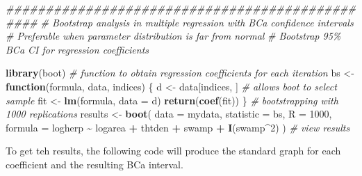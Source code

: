 \documentclass[
  12pt,
]{book}
\newenvironment{Shaded}{\begin{snugshade}}{\end{snugshade}}
\newcommand{\CommentTok}[1]{\textcolor[rgb]{0.56,0.35,0.01}{\textit{#1}}}
\newcommand{\ControlFlowTok}[1]{\textcolor[rgb]{0.13,0.29,0.53}{\textbf{#1}}}
\newcommand{\DataTypeTok}[1]{\textcolor[rgb]{0.13,0.29,0.53}{#1}}
\newcommand{\DecValTok}[1]{\textcolor[rgb]{0.00,0.00,0.81}{#1}}
\newcommand{\KeywordTok}[1]{\textcolor[rgb]{0.13,0.29,0.53}{\textbf{#1}}}
\newcommand{\NormalTok}[1]{#1}
\newcommand{\OperatorTok}[1]{\textcolor[rgb]{0.81,0.36,0.00}{\textbf{#1}}}
\newcommand{\StringTok}[1]{\textcolor[rgb]{0.31,0.60,0.02}{#1}}
\begin{document}
\begin{Shaded}
\begin{Highlighting}[]
\CommentTok{\#\#\#\#\#\#\#\#\#\#\#\#\#\#\#\#\#\#\#\#\#\#\#\#\#\#\#\#\#\#\#\#\#\#\#\#\#\#\#\#\#\#\#\#\#\#\#\#}
\CommentTok{\# Bootstrap analysis in multiple regression with BCa confidence intervals}
\CommentTok{\# Preferable when parameter distribution is far from normal}
\CommentTok{\# Bootstrap 95\% BCa CI for regression coefficients}

\KeywordTok{library}\NormalTok{(boot)}
\CommentTok{\# function to obtain regression coefficients for each iteration}
\NormalTok{bs \textless{}{-}}\StringTok{ }\ControlFlowTok{function}\NormalTok{(formula, data, indices) \{}
\NormalTok{  d \textless{}{-}}\StringTok{ }\NormalTok{data[indices, ] }\CommentTok{\# allows boot to select sample}
\NormalTok{  fit \textless{}{-}}\StringTok{ }\KeywordTok{lm}\NormalTok{(formula, }\DataTypeTok{data =}\NormalTok{ d)}
  \KeywordTok{return}\NormalTok{(}\KeywordTok{coef}\NormalTok{(fit))}
\NormalTok{\}}
\CommentTok{\# bootstrapping with 1000 replications}
\NormalTok{results \textless{}{-}}\StringTok{ }\KeywordTok{boot}\NormalTok{(}
  \DataTypeTok{data =}\NormalTok{ mydata, }\DataTypeTok{statistic =}\NormalTok{ bs, }\DataTypeTok{R =} \DecValTok{1000}\NormalTok{,}
  \DataTypeTok{formula =}\NormalTok{ logherp }\OperatorTok{\textasciitilde{}}\StringTok{ }\NormalTok{logarea }\OperatorTok{+}\StringTok{ }\NormalTok{thtden }\OperatorTok{+}\StringTok{ }\NormalTok{swamp }\OperatorTok{+}\StringTok{ }\KeywordTok{I}\NormalTok{(swamp}\OperatorTok{\^{}}\DecValTok{2}\NormalTok{)}
\NormalTok{)}
\CommentTok{\# view results}
\end{Highlighting}
\end{Shaded}

To get teh results, the following code will produce the standard graph for each coefficient and the resulting BCa interval.
\end{document}
